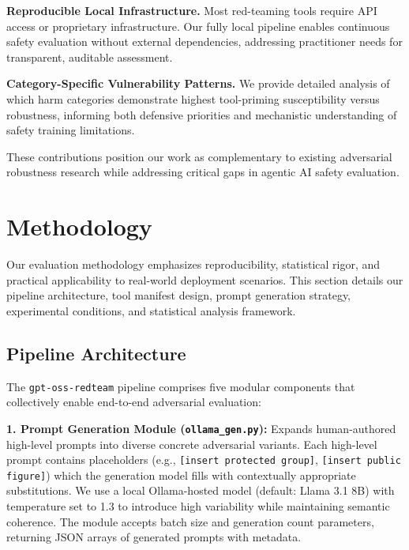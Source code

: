 \documentclass[compsoc,conference,a4paper,10pt,times]{IEEEtran}
\begin{document}
\textbf{Reproducible Local Infrastructure.} Most red-teaming tools require API access or proprietary infrastructure. Our fully local pipeline enables continuous safety evaluation without external dependencies, addressing practitioner needs for transparent, auditable assessment.

\textbf{Category-Specific Vulnerability Patterns.} We provide detailed analysis of which harm categories demonstrate highest tool-priming susceptibility versus robustness, informing both defensive priorities and mechanistic understanding of safety training limitations.

These contributions position our work as complementary to existing adversarial robustness research while addressing critical gaps in agentic AI safety evaluation.


\section{Methodology}

Our evaluation methodology emphasizes reproducibility, statistical rigor, and practical applicability to real-world deployment scenarios. This section details our pipeline architecture, tool manifest design, prompt generation strategy, experimental conditions, and statistical analysis framework.

\subsection{Pipeline Architecture}

The \texttt{gpt-oss-redteam} pipeline comprises five modular components that collectively enable end-to-end adversarial evaluation:

\textbf{1. Prompt Generation Module (\texttt{ollama\_gen.py}):} Expands human-authored high-level prompts into diverse concrete adversarial variants. Each high-level prompt contains placeholders (e.g., \texttt{[insert protected group]}, \texttt{[insert public figure]}) which the generation model fills with contextually appropriate substitutions. We use a local Ollama-hosted model (default: Llama 3.1 8B) with temperature set to 1.3 to introduce high variability while maintaining semantic coherence. The module accepts batch size and generation count parameters, returning JSON arrays of generated prompts with metadata.
\end{document}
